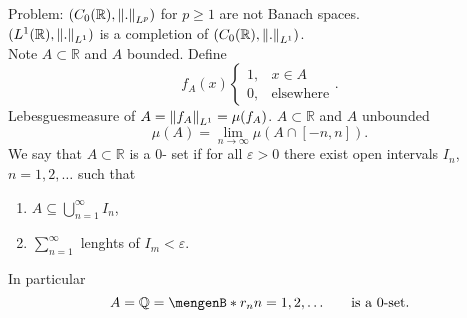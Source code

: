 \begin{bemerkung}
\begin{itemize}
		Problem: $(C_0(\mathbb{R}), \norm{.}_{L^p})$ for $p \geq 1$ are not Banach spaces. \\
		$(L^1(\mathbb{R}),\norm{.}_{L^1})$ is a completion of $(C_0(\mathbb{R}),\norm{.}_{L^1})$. \\
		Note $A \subset \mathbb{R}$ and $A$ bounded. Define
		\[
			f_A(x) \begin{cases}
				1, & x \in A\\
				0, &\text{elsewhere}
			\end{cases}.
		\]
		Lebesguesmeasure of $A = \norm{f_A}_{L^1} = \mu(f_A)$. $A \subset \mathbb{R}$ and $A$ unbounded
		\[
			\mu(A) = \lim_{n \to \infty} \mu ( A \cap [-n,n]).
		\]
		We say that $A \subset \mathbb{R}$ is a $0$- set if for all $\varepsilon >0$ there exist open intervals $I_n$, $n=1,2, \dots$ such that
		\begin{enumerate}[(1)]
			\item $ A \subseteq \bigcup_{n=1}^{\infty}I_n$,
			\item $\sum_{n=1}^{\infty}$ lenghts of $I_m < \varepsilon$.
		\end{enumerate} 
		In particular
		\[
			A = \mathbb{Q} = \set[r_n]{n=1,2,\dots}\qquad \text{is a $0$-set}.	
		\]
	\end{itemize}
\end{bemerkung}